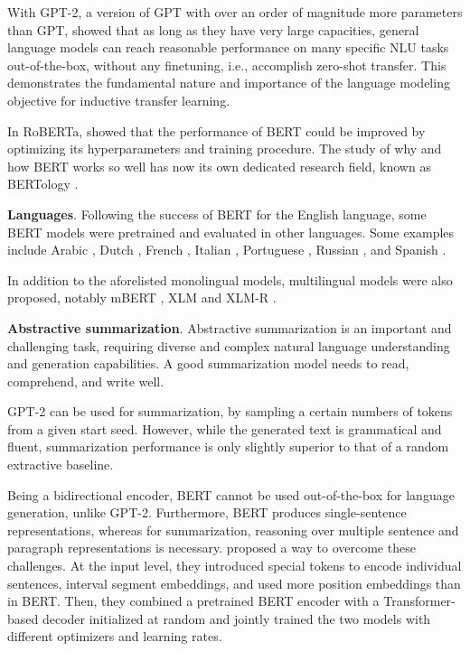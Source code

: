 \documentclass[11pt,a4paper]{article}
\begin{document}
With GPT-2, a version of GPT with over an order of magnitude more parameters than GPT, \citet{radford2019language} showed that as long as they have very large capacities, general language models can reach reasonable performance on many specific NLU tasks out-of-the-box, without any finetuning, i.e., accomplish zero-shot transfer.
This demonstrates the fundamental nature and importance of the language modeling objective for inductive transfer learning.

In RoBERTa, \citet{liu2019roberta} showed that the performance of BERT could be improved by optimizing its hyperparameters and training procedure. The study of why and how BERT works so well has now its own dedicated research field, known as BERTology \cite{rogers2020primer}.

\noindent \textbf{Languages}.
Following the success of BERT for the English language, some BERT models were pretrained and evaluated in other languages.
Some examples include Arabic \cite{antoun2020arabert}, Dutch \cite{de2019bertje,delobelle2020robbert}, French \cite{martin2019camembert,le2019flaubert}, Italian \cite{polignano2019alberto}, Portuguese \cite{souza2019portuguese}, Russian \cite{kuratov2019adaptation}, and Spanish \cite{CaneteCFP2020}.

In addition to the aforelisted monolingual models, multilingual models were also proposed, notably mBERT \cite{devlin2018bert}, XLM \cite{lample2019cross} and XLM-R \cite{conneau2019unsupervised}.

\noindent \textbf{Abstractive summarization}.
Abstractive summarization is an important and challenging task, requiring diverse and complex natural language understanding and generation capabilities.
A good summarization model needs to read, comprehend, and write well.

GPT-2 can be used for summarization, by sampling a certain numbers of tokens from a given start seed.
However, while the generated text is grammatical and fluent, summarization performance is only slightly superior to that of a random extractive baseline.

Being a bidirectional encoder, BERT cannot be used out-of-the-box for language generation, unlike GPT-2.
Furthermore, BERT produces single-sentence representations, whereas for summarization, reasoning over multiple sentence and paragraph representations is necessary.
\citet{liu2019text} proposed a way to overcome these challenges.
At the input level, they introduced special tokens to encode individual sentences, interval segment embeddings, and used more position embeddings than in BERT.
Then, they combined a pretrained BERT encoder with a Transformer-based decoder initialized at random and jointly trained the two models with different optimizers and learning rates.
\end{document}
